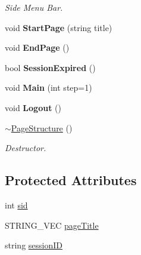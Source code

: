 \begin{DoxyCompactItemize}
\begin{DoxyCompactList}\small\item\em Side Menu Bar. \end{DoxyCompactList}\item 
\hypertarget{classPageStructure_a64fe757647e3cc6bef84f57963c670a2}{void {\bfseries Start\-Page} (string title)}\label{classPageStructure_a64fe757647e3cc6bef84f57963c670a2}

\item 
\hypertarget{classPageStructure_a5ac429859ccea438a54e71861c7c0635}{void {\bfseries End\-Page} ()}\label{classPageStructure_a5ac429859ccea438a54e71861c7c0635}

\item 
\hypertarget{classPageStructure_a5df3b6891370ea23aab712875ef15354}{bool {\bfseries Session\-Expired} ()}\label{classPageStructure_a5df3b6891370ea23aab712875ef15354}

\item 
\hypertarget{classPageStructure_afbd2622eed071f47a25f1a47ca00b7c2}{void {\bfseries Main} (int step=1)}\label{classPageStructure_afbd2622eed071f47a25f1a47ca00b7c2}

\item 
\hypertarget{classPageStructure_a4392473b27947f6a1a4853cdf26845b6}{void {\bfseries Logout} ()}\label{classPageStructure_a4392473b27947f6a1a4853cdf26845b6}

\item 
\hypertarget{classPageStructure_aed8de6249916b83439ae471bc364f2bb}{\hyperlink{classPageStructure_aed8de6249916b83439ae471bc364f2bb}{$\sim$\-Page\-Structure} ()}\label{classPageStructure_aed8de6249916b83439ae471bc364f2bb}

\begin{DoxyCompactList}\small\item\em Destructor. \end{DoxyCompactList}\end{DoxyCompactItemize}
\subsection*{Protected Attributes}
\begin{DoxyCompactItemize}
\item 
int \hyperlink{classPageStructure_a70428385ed3cdc60d45bd432b984f6b9}{sid}
\item 
S\-T\-R\-I\-N\-G\-\_\-\-V\-E\-C \hyperlink{classPageStructure_a7a327c938b42b50933fad2e7ec9b8869}{page\-Title}
\item 
string \hyperlink{classPageStructure_a1e7dca20dd65b68157b35f529d43b7a6}{session\-I\-D}
\end{DoxyCompactItemize}


